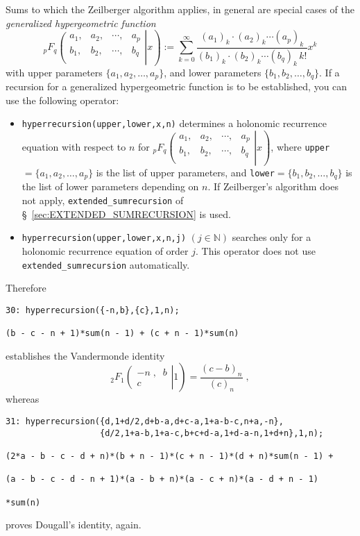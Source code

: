 Sums to which the Zeilberger algorithm applies, in general are
special cases of the \textsl{generalized hypergeometric function}
\[
_{p}F_{q}\left.\left(\begin{array}{cccc}
a_{1},&a_{2},&\cdots,&a_{p}\\
b_{1},&b_{2},&\cdots,&b_{q}\\
            \end{array}\right| x\right)
:=
\sum_{k=0}^\infty \frac
{(a_{1})_{k}\cdot(a_{2})_{k}\cdots(a_{p})_{k}}
{(b_{1})_{k}\cdot(b_{2})_{k}\cdots(b_{q})_{k}\,k!}x^{k}
\label{eq:coefficientformula}
\]
with upper parameters $\{a_{1}, a_{2}, \ldots, a_{p}\}$, and lower
parameters $\{b_{1}, b_{2}, \ldots, b_{q}\}$. If a recursion for a
generalized hypergeometric function is to be established, you can use
the following \REDUCE{} operator:
\begin{itemize}
\item
{\tt hyperrecursion(upper,lower,x,n)} determines a holonomic recurrence
equation with respect to $n$ for
$_{p}F_{q}\left.\left(\begin{array}{cccc}
a_{1},&a_{2},&\cdots,&a_{p}\\
b_{1},&b_{2},&\cdots,&b_{q}\\
            \end{array}\right| x\right)
$, where {\tt upper}$=\{a_{1}, a_{2}, \ldots, a_{p}\}$
is the list of upper parameters, and
{\tt lower}$=\{b_{1}, b_{2}, \ldots, b_{q}\}$
is the list of lower parameters depending on $n$. If Zeilberger's algorithm
does not apply, {\tt extended\_sumrecursion}
of \S~\ref{sec:EXTENDED_SUMRECURSION} is used.
\item
{\tt hyperrecursion(upper,lower,x,n,j)} $(j\in\mathbb{N})$
searches only for a holonomic recurrence equation of order $j$. This
operator does not use {\tt extended\_sumrecursion} automatically.
\end{itemize}
Therefore

{\small
\begin{verbatim}
30: hyperrecursion({-n,b},{c},1,n);

(b - c - n + 1)*sum(n - 1) + (c + n - 1)*sum(n)
\end{verbatim}
}\noindent
establishes the Vandermonde identity
\[
_2 F_1\left.
\left(
\begin{array}{c}
-n\;,\;\;b\\[1mm]
c
\end{array}
\right| 1\right)
=\frac{(c-b)_n}{(c)_n}
\;,
\]
whereas

{\small
\begin{verbatim}
31: hyperrecursion({d,1+d/2,d+b-a,d+c-a,1+a-b-c,n+a,-n},
                   {d/2,1+a-b,1+a-c,b+c+d-a,1+d-a-n,1+d+n},1,n);

(2*a - b - c - d + n)*(b + n - 1)*(c + n - 1)*(d + n)*sum(n - 1) +

(a - b - c - d - n + 1)*(a - b + n)*(a - c + n)*(a - d + n - 1)

*sum(n)
\end{verbatim}
}\noindent
proves Dougall's identity, again.


